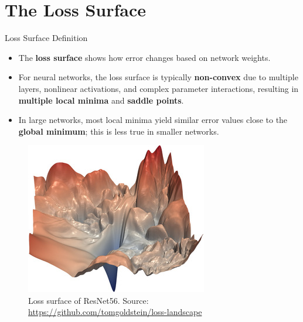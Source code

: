 \documentclass[serif, aspectratio=169]{beamer}
\begin{document}
\section{The Loss Surface}
\begin{frame}{Loss Surface Definition}
    \begin{itemize}
        \item The \textbf{loss surface} shows how error changes based on network weights.
        \item For neural networks, the loss surface is typically \textbf{non-convex} due to multiple layers, nonlinear activations, and complex parameter interactions, resulting in \textbf{multiple local minima} and \textbf{saddle points}.
        \item In large networks, most local minima yield similar error values close to the \textbf{global minimum}; this is less true in smaller networks.
    \end{itemize}
    \begin{figure}[h]
        \centering
        \includegraphics[height=0.4\textheight]{pic/resnet56_noshort_small.jpg}
        \caption{\footnotesize Loss surface of ResNet56. Source: \url{https://github.com/tomgoldstein/loss-landscape}}
    \end{figure}
\end{frame}
\end{document}
